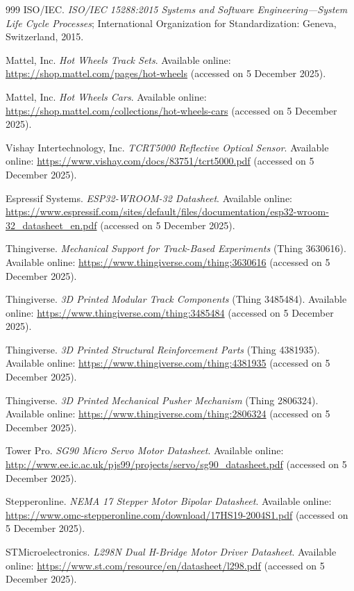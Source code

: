 \documentclass[journal,article,submit,pdftex]{Definitions/mdpi}
\begin{document}
\begin{thebibliography}{999}
ISO/IEC.
\textit{ISO/IEC 15288:2015 Systems and Software Engineering---System Life Cycle Processes};
International Organization for Standardization: Geneva, Switzerland, 2015.

Mattel, Inc.
\textit{Hot Wheels Track Sets}.
Available online: \url{https://shop.mattel.com/pages/hot-wheels} (accessed on 5 December 2025).

Mattel, Inc.
\textit{Hot Wheels Cars}.
Available online: \url{https://shop.mattel.com/collections/hot-wheels-cars} (accessed on 5 December 2025).

Vishay Intertechnology, Inc.
\textit{TCRT5000 Reflective Optical Sensor}.
Available online: \url{https://www.vishay.com/docs/83751/tcrt5000.pdf} (accessed on 5 December 2025).

Espressif Systems.
\textit{ESP32-WROOM-32 Datasheet}.
Available online: \url{https://www.espressif.com/sites/default/files/documentation/esp32-wroom-32_datasheet_en.pdf} (accessed on 5 December 2025).

Thingiverse.
\textit{Mechanical Support for Track-Based Experiments} (Thing 3630616).
Available online: \url{https://www.thingiverse.com/thing:3630616} (accessed on 5 December 2025).

Thingiverse.
\textit{3D Printed Modular Track Components} (Thing 3485484).
Available online: \url{https://www.thingiverse.com/thing:3485484} (accessed on 5 December 2025).

Thingiverse.
\textit{3D Printed Structural Reinforcement Parts} (Thing 4381935).
Available online: \url{https://www.thingiverse.com/thing:4381935} (accessed on 5 December 2025).

Thingiverse.
\textit{3D Printed Mechanical Pusher Mechanism} (Thing 2806324).
Available online: \url{https://www.thingiverse.com/thing:2806324} (accessed on 5 December 2025).

Tower Pro.
\textit{SG90 Micro Servo Motor Datasheet}.
Available online: \url{http://www.ee.ic.ac.uk/pjs99/projects/servo/sg90_datasheet.pdf} (accessed on 5 December 2025).

Stepperonline.
\textit{NEMA 17 Stepper Motor Bipolar Datasheet}.
Available online: \url{https://www.omc-stepperonline.com/download/17HS19-2004S1.pdf} (accessed on 5 December 2025).

STMicroelectronics.
\textit{L298N Dual H-Bridge Motor Driver Datasheet}.
Available online: \url{https://www.st.com/resource/en/datasheet/l298.pdf} (accessed on 5 December 2025).


\end{thebibliography}
\end{document}
